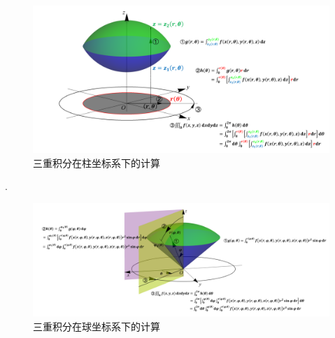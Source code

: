 \documentclass[12pt,UTF8]{ctexart}
\begin{document}
\begin{enumerate}
\begin{figure}[H]
\begin{center}
\includegraphics[height=0.4\textheight,angle=0]{Figures20190611/pillar.pdf}
\end{center}
\caption{三重积分在柱坐标系下的计算}
\end{figure}
.
\begin{figure}[H]
\begin{center}
\includegraphics[height=0.3\textheight,angle=0]{Figures20190611/sphere.pdf}
\end{center}
\caption{三重积分在球坐标系下的计算}
\end{figure}
\end{enumerate}
\end{document}

